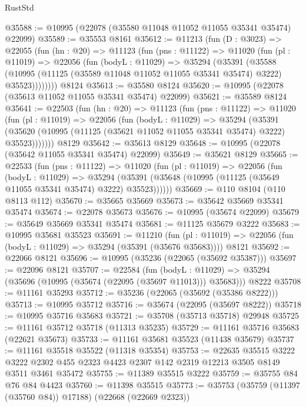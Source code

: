 \begin{lexlean}{RustStd}
\begin{coremodule}
@35588 := @10995 (@22078 (@35580 @11048 @11052 @11055 @35341 @35474) @22099)
@35589 := @35553 @8161
@35612 := @11213
    (fun (D : @3023) =>
    @22055
      (fun (hn : @20) =>
      @11123
        (fun (pns : @11122) =>
        @11020
          (fun (pl : @11019) =>
          @22056
            (fun (bodyL : @11029) =>
            @35294
              (@35391
                (@35588
                  (@10995 (@11125 (@35589 @11048 @11052 @11055 @35341 @35474) @3222) @35523))))))))
    @8124
@35613 := @35580 @8124
@35620 := @10995 (@22078 (@35613 @11052 @11055 @35341 @35474) @22099)
@35621 := @35589 @8124
@35641 := @22503
    (fun (hn : @20) =>
    @11123
      (fun (pns : @11122) =>
      @11020
        (fun (pl : @11019) =>
        @22056
          (fun (bodyL : @11029) =>
          @35294
            (@35391
              (@35620 (@10995 (@11125 (@35621 @11052 @11055 @35341 @35474) @3222) @35523)))))))
    @8129
@35642 := @35613 @8129
@35648 := @10995 (@22078 (@35642 @11055 @35341 @35474) @22099)
@35649 := @35621 @8129
@35665 := @22533
    (fun (pns : @11122) =>
    @11020
      (fun (pl : @11019) =>
      @22056
        (fun (bodyL : @11029) =>
        @35294 (@35391 (@35648 (@10995 (@11125 (@35649 @11055 @35341 @35474) @3222) @35523))))))
@35669 := @110 @8104 (@110 @8113 @112)
@35670 := @35665 @35669
@35673 := @35642 @35669 @35341 @35474
@35674 := @22078 @35673
@35676 := @10995 (@35674 @22099)
@35679 := @35649 @35669 @35341 @35474
@35681 := @11125 @35679 @3222
@35683 := @10995 @35681 @35523
@35691 := @11210
    (fun (pl : @11019) => @22056 (fun (bodyL : @11029) => @35294 (@35391 (@35676 @35683))))
    @8121
@35692 := @22066 @8121
@35696 := @10995 (@35236 (@22065 (@35692 @35387)))
@35697 := @22096 @8121
@35707 := @22584
    (fun (bodyL : @11029) => @35294 (@35696 (@10995 (@35674 (@22095 (@35697 @11013))) @35683)))
    @8222
@35708 := @11161 @35293
@35712 := @35236 (@22065 (@35692 (@35386 @8222)))
@35713 := @10995 @35712
@35716 := @35674 (@22095 (@35697 @8222))
@35718 := @10995 @35716 @35683
@35721 := @35708 (@35713 @35718) @29948
@35725 := @11161 @35712 @35718 (@11313 @35235)
@35729 := @11161 @35716 @35683 (@22621 @35673)
@35733 := @11161 @35681 @35523 (@11438 @35679)
@35737 := @11161 @35518 @35522 (@11318 @35354)
@35753 := @22635
    @35515
    @3222
    @3222
    @2302
    @455
    @2323
    @4423
    @2307
    @142
    @2319
    @12213
    @3505
    @8149
    @3511
    @3461
    @35472
@35755 := @11389 @35515 @3222
@35759 := @35755 @84 @76 @84 @4423
@35760 := @11398 @35515
@35773 := @35753
    (@35759 (@11397 (@35760 @84)) @17188)
    (@22668 (@22669 @2323))

\end{coremodule}
\end{lexlean}
